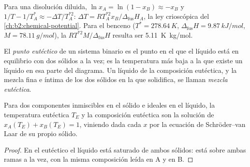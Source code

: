 Para una disolución diluida, $\ln x_A = \ln(1 - x_B) \approx -x_B$ y $1/T -
1/T_A^* \approx -\Delta T/T_A^{*2}$: $\Delta T = RT_A^{*2}x_B/\Delta_{\text{fus}}H_A$,
la ley crioscópica del \cref{ch:b2:chemical-potential}. Para el benceno ($T^* =
\qty{278.64}{K}$, $\Delta_{\text{fus}}H = \qty{9.87}{kJ/mol}$, $M =
\qty{78.11}{g/mol}$), la  $RT^{*2}M/\Delta_{\text{fus}}H$
resulta ser \qty{5.11}{K.kg/mol}.

\begin{definition}[Eutéctico]\label{def:b2:solid-liquid-diagrams:eutectic}
El \emph{punto eutéctico} de un sistema binario es el
punto en el que el líquido está en equilibrio con dos sólidos a la vez; es la
temperatura más baja a la que existe un líquido en esa parte del diagrama. Un
líquido de la composición eutéctica, y la mezcla fina e íntima de los dos
sólidos en la que solidifica, se llaman \emph{mezcla
eutéctica}.
\end{definition}

\begin{corollary}\label{cor:b2:solid-liquid-diagrams:eutectic}
Para dos componentes inmiscibles en el sólido e ideales en el líquido, la
temperatura eutéctica $T_E$ y la composición eutéctica son la solución de
$x_A(T_E) + x_B(T_E) = 1$, viniendo dada cada $x$ por la ecuación de Schröder--van Laar
de su propio sólido.
\end{corollary}

\begin{proof}
En el eutéctico el líquido está saturado de ambos sólidos: está sobre ambas
ramas a la vez, con la misma composición leída en A y en B.
\end{proof}

